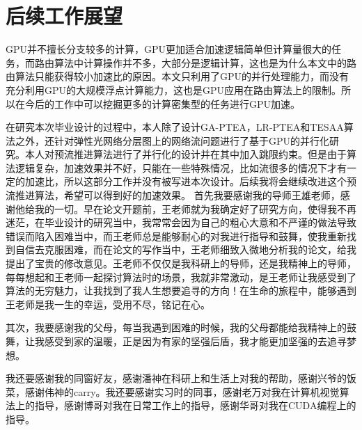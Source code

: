 \documentclass[master]{thesis-uestc}
\begin{document}
\section{后续工作展望}
GPU并不擅长分支较多的计算，GPU更加适合加速逻辑简单但计算量很大的任务，而路由算法中计算操作并不多，大部分是逻辑计算，这也是为什么本文中的路由算法只能获得较小加速比的原因。本文只利用了GPU的并行处理能力，而没有充分利用GPU的大规模浮点计算能力，这也是GPU应用在路由算法上的限制。所以在今后的工作中可以挖掘更多的计算密集型的任务进行GPU加速。

在研究本次毕业设计的过程中，本人除了设计GA-PTEA，LR-PTEA和TESAA算法之外，还针对弹性光网络分层图上的网络流问题进行了基于GPU的并行化研究。本人对预流推进算法进行了并行化的设计并在其中加入跳限约束。但是由于算法逻辑复杂，加速效果并不好，只能在一些特殊情况，比如流很多的情况下才有一定的加速比，所以这部分工作并没有被写进本次设计。后续我将会继续改进这个预流推进算法，希望可以得到好的加速效果。
\thesisacknowledgement
首先我要感谢我的导师王雄老师，感谢他给我的一切。早在论文开题前，王老师就为我确定好了研究方向，使得我不再迷茫，在毕业设计的研究当中，我常常会因为自己的粗心大意和不严谨的做法导致错误而陷入困难当中，而王老师总是能够耐心的对我进行指导和鼓舞，使我重新找到自信去克服困难，而在论文的写作当中，王老师细致入微地分析我的论文，给我提出了宝贵的修改意见。王老师不仅仅是我科研上的导师，还是我精神上的导师，每每想起和王老师一起探讨算法时的场景，我就非常激动，是王老师让我感受到了算法的无穷魅力，让我找到了我人生想要追寻的方向！在生命的旅程中，能够遇到王老师是我一生的幸运，受用不尽，铭记在心。

其次，我要感谢我的父母，每当我遇到困难的时候，我的父母都能给我精神上的鼓舞，让我感受到家的温暖，正是因为有家的坚强后盾，我才能更加坚强的去追寻梦想。

我还要感谢我的同窗好友，感谢潘神在科研上和生活上对我的帮助，感谢兴爷的饭菜，感谢伟神的carry。我还要感谢实习时的同事，感谢老万对我在计算机视觉算法上的指导，感谢博哥对我在日常工作上的指导，感谢华哥对我在CUDA编程上的指导。

\end{document}
